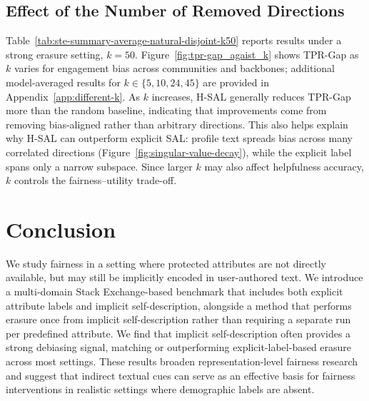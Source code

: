 \documentclass[11pt]{article}
\begin{document}
\subsection{Effect of the Number of Removed Directions}
\label{sec:effect_of_k}

Table~\ref{tab:ste-summary-average-natural-disjoint-k50} reports results under a strong erasure setting, \(k=50\). Figure~\ref{fig:tpr-gap_agaist_k} shows TPR-Gap as \(k\) varies for engagement bias across communities and backbones; additional model-averaged results for \(k \in \{5,10,24,45\}\) are provided in Appendix~\ref{app:different-k}. As \(k\) increases, H-\textsc{SAL} generally reduces TPR-Gap more than the random baseline, indicating that improvements come from removing bias-aligned rather than arbitrary directions. 
This also helps explain why H-\textsc{SAL} can outperform explicit \textsc{SAL}: profile text spreads bias across many correlated directions (Figure~\ref{fig:singular-value-decay}), while the explicit label spans only a narrow subspace.
Since larger \(k\) may also affect helpfulness accuracy, \(k\) controls the fairness--utility trade-off.















































\section{Conclusion}

We study fairness in a setting where protected attributes are not directly available, but may still be implicitly encoded in user-authored text. We introduce a multi-domain Stack Exchange-based benchmark that includes both explicit attribute labels and implicit self-description, alongside a method that performs erasure once from implicit self-description rather than requiring a separate run per predefined attribute. We find that implicit self-description often provides a strong debiasing signal, matching or outperforming explicit-label-based erasure across most settings. These results broaden representation-level fairness research and suggest that indirect textual cues can serve as an effective basis for fairness interventions in realistic settings where demographic labels are absent.
\end{document}
